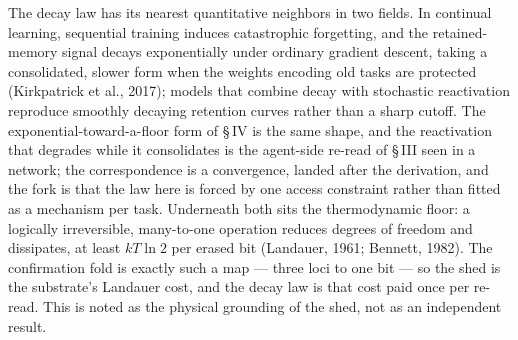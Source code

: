 \documentclass[11pt,oneside]{report}
\theoremstyle{definition}
\theoremstyle{remark}
\begin{document}
The decay law has its nearest quantitative neighbors in two fields. In
continual learning, sequential training induces catastrophic forgetting,
and the retained-memory signal decays exponentially under ordinary
gradient descent, taking a consolidated, slower form when the weights
encoding old tasks are protected (Kirkpatrick et al., 2017); models that
combine decay with stochastic reactivation reproduce smoothly decaying
retention curves rather than a sharp cutoff. The exponential-toward-a-floor
form of \S\,IV is the same shape, and the reactivation that degrades while
it consolidates is the agent-side re-read of \S\,III seen in a network;
the correspondence is a convergence, landed after the derivation, and the
fork is that the law here is forced by one access constraint rather than
fitted as a mechanism per task. Underneath both sits the thermodynamic
floor: a logically irreversible, many-to-one operation reduces degrees of
freedom and dissipates, at least \ensuremath{kT\ln 2} per erased bit
(Landauer, 1961; Bennett, 1982). The confirmation fold is exactly such a
map --- three loci to one bit --- so the shed is the substrate's Landauer
cost, and the decay law is that cost paid once per re-read. This is noted
as the physical grounding of the shed, not as an independent result.
\end{document}

